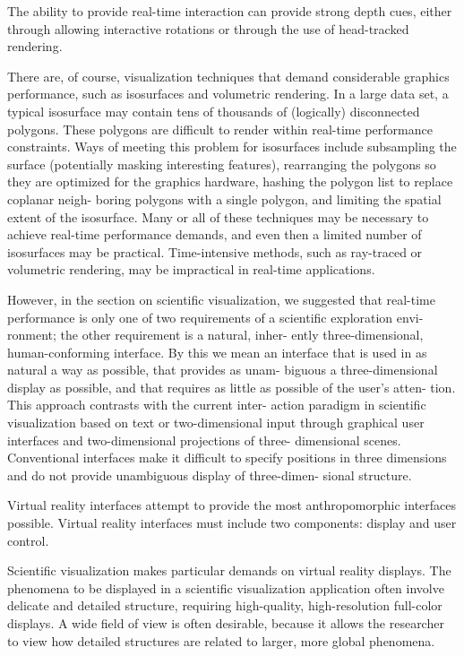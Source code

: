 The ability to provide real-time interaction can provide strong depth cues, either through allowing interactive rotations or through the use of head-tracked rendering.

There are, of course, visualization techniques that demand considerable graphics performance, such as isosurfaces and volumetric rendering. In a large data set, a typical isosurface may contain tens of thousands of (logically) disconnected polygons. These polygons are difficult to render within real-time performance constraints. Ways of meeting this problem for isosurfaces include subsampling the surface (potentially masking interesting features), rearranging the polygons so they are optimized for the graphics hardware, hashing the polygon list to replace coplanar neigh- boring polygons with a single polygon, and limiting the spatial extent of the isosurface. Many or all of these techniques may be necessary to achieve real-time performance demands, and even then a limited number of isosurfaces may be practical. Time-intensive methods, such as ray-traced or volumetric rendering, may be impractical in real-time applications.

However, in the section on scientific visualization, we suggested that real-time performance is only one of two requirements of a scientific exploration envi- ronment; the other requirement is a natural, inher- ently three-dimensional, human-conforming interface. By this we mean an interface that is used in as natural a way as possible, that provides as unam- biguous a three-dimensional display as possible, and that requires as little as possible of the user’s atten- tion. This approach contrasts with the current inter- action paradigm in scientific visualization based on text or two-dimensional input through graphical user interfaces and two-dimensional projections of three- dimensional scenes. Conventional interfaces make it difficult to specify positions in three dimensions and do not provide unambiguous display of three-dimen- sional structure.

Virtual reality interfaces attempt to provide the most anthropomorphic interfaces possible. Virtual reality interfaces must include two components: display and user control. 

Scientific visualization makes particular demands on virtual reality displays. The phenomena to be displayed in a scientific visualization application often involve delicate and detailed structure, requiring high-quality, high-resolution full-color displays. A wide field of view is often desirable, because it allows the researcher to view how detailed structures are related to larger, more global phenomena.

